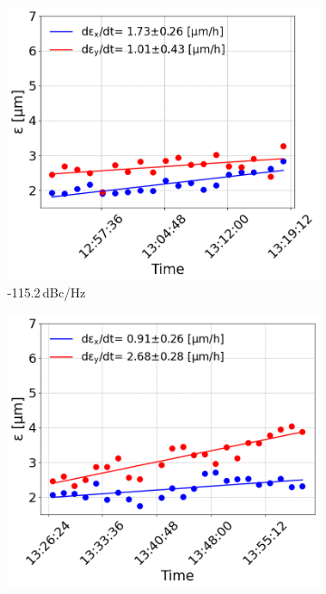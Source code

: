 \begin{figure}[htp]
   \centering
   \begin{subfigure}{.45\textwidth}
       \centering
       \includegraphics[width=.95\linewidth]{images/Ch8/emit_vs_time_Set1_coast2.png}  
       \caption{-115.2\,dBc/Hz}
       \label{fig:cc_md_2022_coast2}
   \end{subfigure}
   \begin{subfigure}{.45\textwidth}
       \centering
       \includegraphics[width=.95\linewidth]{images/Ch8/emit_vs_time_Set1_coast3.png}  

\end{subfigure}
\end{figure}
